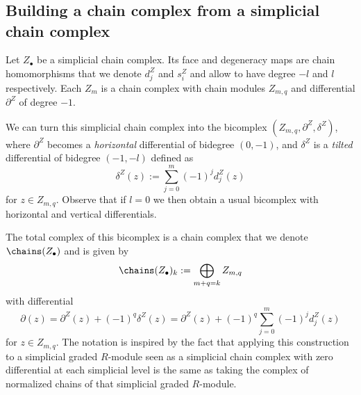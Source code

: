 \newpage
\appendix
\section{}
\subsection{Building a chain complex from a simplicial chain complex}

Let $Z_\bullet$ be a simplicial chain complex. Its face and degeneracy maps are chain homomorphisms that we denote $d^Z_j$ and $s^Z_i$ and allow to have degree $-l$ and $l$ respectively.  Each $Z_m$ is a chain complex with chain modules $Z_{m,q}$ and differential $\partial^Z$ of degree $-1$. 

We can turn this simplicial chain complex into the bicomplex $(Z_{m,q}, \partial^Z,\delta^Z)$, where $\partial^Z$ becomes a \emph{horizontal} differential of bidegree $(0,-1)$, and $\delta^Z$ is a \emph{tilted} differential of bidegree $(-1,-l)$ defined as
\[
\delta^Z(z):=\sum_{j=0}^m (-1)^j d^Z_j(z)
\] 
for $z\in Z_{m,q}$. Observe that if $l=0$ we then obtain a usual bicomplex with horizontal and vertical differentials.

The total complex of this bicomplex is a chain complex that we denote $\chains (Z_\bullet)$ and is given by
\[
\chains (Z_\bullet)_k:=\bigoplus_{m+q=k} Z_{m,q}
\]
with differential
\[
\partial (z)=\partial^Z(z)+ (-1)^q\delta^Z(z)=\partial^Z(z)+(-1)^q\sum_{j=0}^m(-1)^jd^Z_j(z)
\]
for $z\in Z_{m,q}$. 
The notation is inspired by the fact that applying this construction to a simplicial graded $R$-module seen as a simplicial chain complex with zero differential at each simplicial level is the same as taking the complex of normalized chains of that simplicial graded $R$-module.


